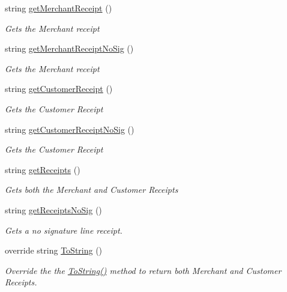 \begin{DoxyCompactItemize}
string \mbox{\hyperlink{class_cert_complete_1_1_receipt_printer_a0d9f01abe1b38c21bf8d169c3319c5cf}{get\+Merchant\+Receipt}} ()
\begin{DoxyCompactList}\small\item\em Gets the Merchant receipt \end{DoxyCompactList}\item 
string \mbox{\hyperlink{class_cert_complete_1_1_receipt_printer_a841afc646b9a729855e815aad55fc833}{get\+Merchant\+Receipt\+No\+Sig}} ()
\begin{DoxyCompactList}\small\item\em Gets the Merchant receipt \end{DoxyCompactList}\item 
string \mbox{\hyperlink{class_cert_complete_1_1_receipt_printer_a9e2870661b5826b3ad12f415b36a91d3}{get\+Customer\+Receipt}} ()
\begin{DoxyCompactList}\small\item\em Gets the Customer Receipt \end{DoxyCompactList}\item 
string \mbox{\hyperlink{class_cert_complete_1_1_receipt_printer_a9bf88eebc2aa0a15a6c17be08e2f4ffe}{get\+Customer\+Receipt\+No\+Sig}} ()
\begin{DoxyCompactList}\small\item\em Gets the Customer Receipt \end{DoxyCompactList}\item 
string \mbox{\hyperlink{class_cert_complete_1_1_receipt_printer_af48884b7e27f8c5dd115880a7ae4ee35}{get\+Receipts}} ()
\begin{DoxyCompactList}\small\item\em Gets both the Merchant and Customer Receipts \end{DoxyCompactList}\item 
string \mbox{\hyperlink{class_cert_complete_1_1_receipt_printer_a98603c743b4fc78d8a9a57bc01b3c107}{get\+Receipts\+No\+Sig}} ()
\begin{DoxyCompactList}\small\item\em Gets a no signature line receipt. \end{DoxyCompactList}\item 
override string \mbox{\hyperlink{class_cert_complete_1_1_receipt_printer_a5feb1b4895e079a595f0b01cac5fc6da}{To\+String}} ()
\begin{DoxyCompactList}\small\item\em Override the the \mbox{\hyperlink{class_cert_complete_1_1_receipt_printer_a5feb1b4895e079a595f0b01cac5fc6da}{To\+String()}} method to return both Merchant and Customer Receipts. \end{DoxyCompactList}\item 

\end{DoxyCompactItemize}
